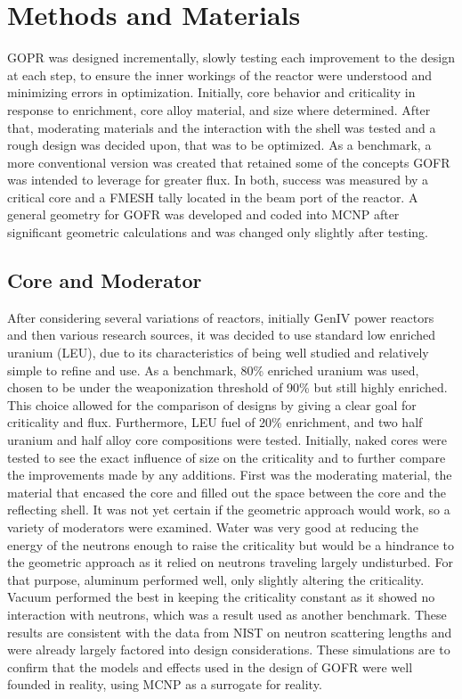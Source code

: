 \section{Methods and Materials}
\label{sec:methods}

GOPR was designed incrementally, slowly testing each improvement to the design at each step, to ensure the inner workings of the reactor were understood and minimizing errors in optimization.  Initially, core behavior and criticality in response to enrichment, core alloy material, and size where determined. After that, moderating materials and the interaction with the shell was tested and a rough design was decided upon, that was to be optimized. As a benchmark, a more conventional version was created that retained some of the concepts GOFR was intended to leverage for greater flux. In both, success was measured by a critical core and a FMESH tally located in the beam port of the reactor. A general geometry for GOFR was developed and coded into MCNP after significant geometric calculations and was changed only slightly after testing.

\subsection{Core and Moderator}

After considering several variations of reactors, initially GenIV power reactors and then various research sources, it was decided to use standard low enriched uranium (LEU), due to its characteristics of being well studied and relatively simple to refine and use. As a benchmark, 80\% enriched uranium was used, chosen to be under the weaponization threshold of 90\% but still highly enriched. This choice allowed for the comparison of designs by giving a clear goal for criticality and flux. Furthermore, LEU fuel of 20\% enrichment, and two half uranium and half alloy core compositions were tested. Initially, naked cores were tested to see the exact influence of size on the criticality and to further compare the improvements made by any additions. First was the moderating material, the material that encased the core and filled out the space between the core and the reflecting shell. It was not yet certain if the geometric approach would work, so a variety of moderators were examined. Water was very good at reducing the energy of the neutrons enough to raise the criticality but would be a hindrance to the geometric approach as it relied on neutrons traveling largely undisturbed. For that purpose, aluminum performed well, only slightly altering the criticality. Vacuum performed the best in keeping the criticality constant as it showed no interaction with neutrons, which was a result used as another benchmark. These results are consistent with the data from NIST on neutron scattering lengths and were already largely factored into design considerations. These simulations are to confirm that the models and effects used in the design of GOFR were well founded in reality, using MCNP as a surrogate for reality.

